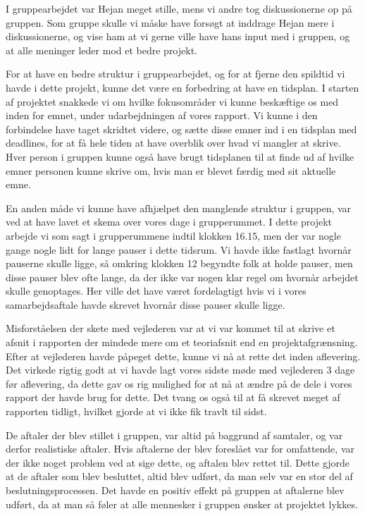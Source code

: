 I gruppearbejdet var Hejan meget stille, mens vi andre tog diskussionerne op på gruppen. Som gruppe skulle vi måske have forsøgt at inddrage Hejan mere i diskussionerne, og vise ham at vi gerne ville have hans input med i gruppen, og at alle meninger leder mod et bedre projekt.

For at have en bedre struktur i gruppearbejdet, og for at fjerne den spildtid vi havde i dette projekt, kunne det være en forbedring at have en tidsplan. I starten af projektet snakkede vi om hvilke fokusområder vi kunne beskæftige os med inden for emnet, under udarbejdningen af vores rapport. Vi kunne i den forbindelse have taget skridtet videre, og sætte disse emner ind i en tidsplan med deadlines, for at få hele tiden at have overblik over hvad vi mangler at skrive. Hver person i gruppen kunne også have brugt tidsplanen til at finde ud af hvilke emner personen kunne skrive om, hvis man er blevet færdig med sit aktuelle emne.

En anden måde vi kunne have afhjælpet den manglende struktur i gruppen, var ved at have lavet et skema over vores dage i grupperummet. I dette projekt arbejde vi som sagt i grupperummene indtil klokken 16.15, men der var nogle gange nogle lidt for lange pauser i dette tidsrum. Vi havde ikke fastlagt hvornår pauserne skulle ligge, så omkring klokken 12 begyndte folk at holde pauser, men disse pauser blev ofte lange, da der ikke var nogen klar regel om hvornår arbejdet skulle genoptages. Her ville det have været fordelagtigt hvis vi i vores samarbejdsaftale havde skrevet hvornår disse pauser skulle ligge.

Misforståelsen der skete med vejlederen var at vi var kommet til at skrive et afsnit i rapporten der mindede mere om et teoriafsnit end en projektafgrænsning. Efter at vejlederen havde påpeget dette, kunne vi nå at rette det inden aflevering. Det virkede rigtig godt at vi havde lagt vores sidste møde med vejlederen 3 dage før aflevering, da dette gav os rig mulighed for at nå at ændre på de dele i vores rapport der havde brug for dette. Det tvang os også til at få skrevet meget af rapporten tidligt, hvilket gjorde at vi ikke fik travlt til sidst.

De aftaler der blev stillet i gruppen, var altid på baggrund af samtaler, og var derfor realistiske aftaler. Hvis aftalerne der blev foreslået var for omfattende, var der ikke noget problem ved at sige dette, og aftalen blev rettet til. Dette gjorde at de aftaler som blev besluttet, altid blev udført, da man selv var en stor del af beslutningsprocessen. Det havde en positiv effekt på gruppen at aftalerne blev udført, da at man så føler at alle mennesker i gruppen ønsker at projektet lykkes.

